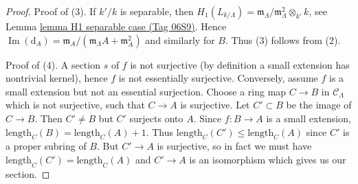 \documentclass{amsart}
\theoremstyle{plain}
\theoremstyle{definition}
\theoremstyle{remark}
\numberwithin{equation}{subsection}
\def\Im{\mathop{\mathrm{Im}}}
\begin{document}
\begin{proof}
\medskip\noindent
Proof of (3). If $k'/k$ is separable, then
$H_1(L_{k/\Lambda}) =
\mathfrak m_\Lambda/\mathfrak m_\Lambda^2 \otimes_{k'} k$, see
Lemma \href{https://stacks.math.columbia.edu/tag/06S9}{lemma H1 separable case (Tag 06S9)}.
Hence $\Im(\text{d}_A) =
\mathfrak m_A/(\mathfrak m_\Lambda A + \mathfrak m_A^2)$
and similarly for $B$. Thus (3) follows from (2).

\medskip\noindent
Proof of (4). A section $s$ of $f$ is not surjective (by definition a
small extension has nontrivial kernel), hence $f$ is not essentially
surjective. Conversely, assume $f$ is a small extension but not an
essential surjection. Choose a ring map $C \to B$ in $\mathcal{C}_\Lambda$
which is not surjective, such that $C \to A$ is surjective. Let
$C' \subset B$ be the image of $C \to B$. Then $C' \not = B$ but
$C'$ surjects onto $A$. Since $f : B \to A$ is a small extension,
$\text{length}_C(B) = \text{length}_C(A) + 1$. Thus
$\text{length}_C(C') \leq \text{length}_C(A)$ since
$C'$ is a proper subring of $B$. But $C' \to A$ is surjective, so in
fact we must have $\text{length}_C(C') = \text{length}_C(A)$ and
$C' \to A$ is an isomorphism which gives us our section.
\end{proof}
\end{document}

